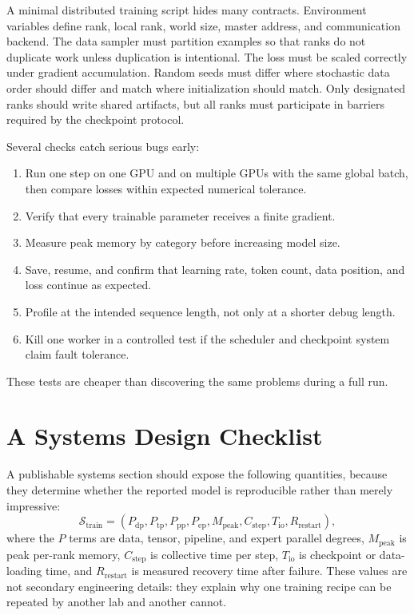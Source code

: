 A minimal distributed training script hides many contracts. Environment variables define rank, local rank, world size, master address, and communication backend. The data sampler must partition examples so that ranks do not duplicate work unless duplication is intentional. The loss must be scaled correctly under gradient accumulation. Random seeds must differ where stochastic data order should differ and match where initialization should match. Only designated ranks should write shared artifacts, but all ranks must participate in barriers required by the checkpoint protocol.

Several checks catch serious bugs early:
\begin{enumerate}
\item Run one step on one GPU and on multiple GPUs with the same global batch, then compare losses within expected numerical tolerance.
\item Verify that every trainable parameter receives a finite gradient.
\item Measure peak memory by category before increasing model size.
\item Save, resume, and confirm that learning rate, token count, data position, and loss continue as expected.
\item Profile at the intended sequence length, not only at a shorter debug length.
\item Kill one worker in a controlled test if the scheduler and checkpoint system claim fault tolerance.
\end{enumerate}
These tests are cheaper than discovering the same problems during a full run.

\section{A Systems Design Checklist}
\label{sec:distributed-systems-design-checklist}

A publishable systems section should expose the following quantities, because they determine whether the reported model is reproducible rather than merely impressive:
\begin{equation}
  \mathcal{S}_{\mathrm{train}} =
  (P_{\mathrm{dp}}, P_{\mathrm{tp}}, P_{\mathrm{pp}}, P_{\mathrm{ep}},
   M_{\mathrm{peak}}, C_{\mathrm{step}}, T_{\mathrm{io}},
   R_{\mathrm{restart}}),
\end{equation}
where the $P$ terms are data, tensor, pipeline, and expert parallel degrees, $M_{\mathrm{peak}}$ is peak per-rank memory, $C_{\mathrm{step}}$ is collective time per step, $T_{\mathrm{io}}$ is checkpoint or data-loading time, and $R_{\mathrm{restart}}$ is measured recovery time after failure. These values are not secondary engineering details: they explain why one training recipe can be repeated by another lab and another cannot.

